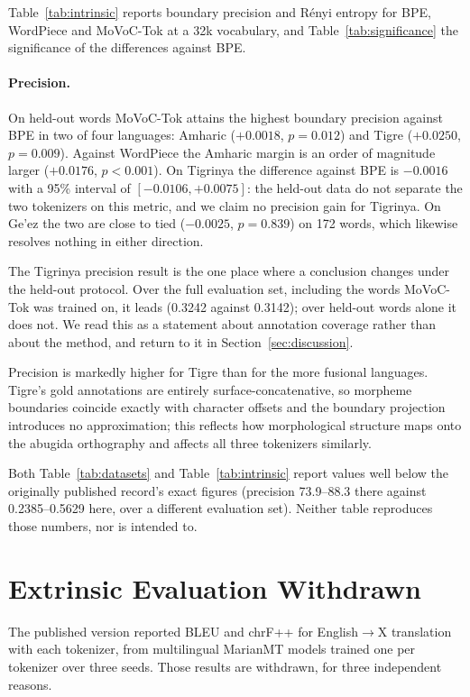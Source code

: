 \documentclass[11pt]{article}
\begin{document}
Table~\ref{tab:intrinsic} reports boundary precision and R\'enyi entropy for
BPE, WordPiece and MoVoC-Tok at a 32k vocabulary, and
Table~\ref{tab:significance} the significance of the differences against BPE.

\paragraph{Precision.}
On held-out words MoVoC-Tok attains the highest boundary precision against BPE
in two of four languages: Amharic ($+0.0018$, $p = 0.012$) and Tigre
($+0.0250$, $p = 0.009$). Against WordPiece the Amharic margin is an order of
magnitude larger ($+0.0176$, $p < 0.001$). On Tigrinya the difference against
BPE is $-0.0016$ with a 95\% interval of $[-0.0106, +0.0075]$: the held-out
data do not separate the two tokenizers on this metric, and we claim no
precision gain for Tigrinya. On Ge'ez the two are close to tied ($-0.0025$,
$p = 0.839$) on 172 words, which likewise resolves nothing in either
direction.

The Tigrinya precision result is the one place where a conclusion changes under
the held-out protocol. Over the full evaluation set, including the words
MoVoC-Tok was trained on, it leads (0.3242 against 0.3142); over held-out words
alone it does not. We read this as a statement about annotation coverage rather
than about the method, and return to it in Section~\ref{sec:discussion}.

Precision is markedly higher for Tigre than for the more fusional languages.
Tigre's gold annotations are entirely surface-concatenative, so morpheme
boundaries coincide exactly with character offsets and the boundary
projection introduces no approximation; this reflects how morphological
structure maps onto the abugida orthography and affects all three
tokenizers similarly.

Both Table~\ref{tab:datasets} and Table~\ref{tab:intrinsic} report values well
below the originally published record's exact figures (precision 73.9--88.3
there against 0.2385--0.5629 here, over a different evaluation set). Neither
table reproduces those numbers, nor is intended to.

\section{Extrinsic Evaluation Withdrawn}
\label{sec:extrinsic}

The published version reported BLEU and chrF++ for English$\rightarrow$X
translation with each tokenizer, from multilingual MarianMT models trained one
per tokenizer over three seeds. Those results are withdrawn, for three
independent reasons.
\end{document}
